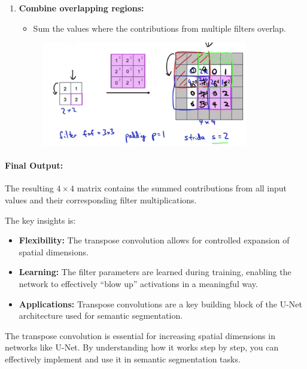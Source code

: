\documentclass[letterpaper,12pt,notitlepage,twoside]{report}
\begin{document}
\begin{enumerate}
    \item \textbf{Combine overlapping regions:}
    \begin{itemize}
        \item Sum the values where the contributions from multiple filters overlap.
    \end{itemize}
	\begin{figure}[h]
		\centering
		\includegraphics[width=0.85\textwidth]{Images/Transpose Convolution - Final Step.png}
		\label{fig:51}
	\end{figure}
	\FloatBarrier
\end{enumerate}

\paragraph{Final Output:} The resulting $4 \times 4$ matrix contains the summed contributions from all input values and their corresponding filter multiplications.

The key insights is:
\begin{itemize}[nosep]
    \item \textbf{Flexibility:} The transpose convolution allows for controlled expansion of spatial dimensions.
    \item \textbf{Learning:} The filter parameters are learned during training, enabling the network to effectively ``blow up'' activations in a meaningful way.
    \item \textbf{Applications:} Transpose convolutions are a key building block of the U-Net architecture used for semantic segmentation.
\end{itemize}

The transpose convolution is essential for increasing spatial dimensions in networks like U-Net. By understanding how it works step by step, you can effectively implement and use it in semantic segmentation tasks. 

\end{document}

